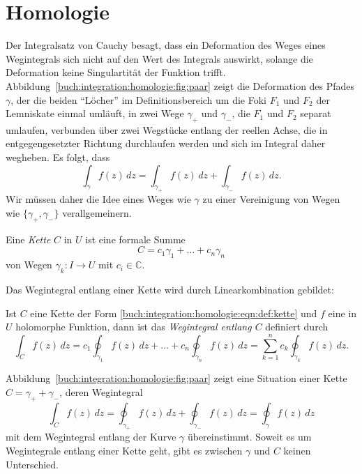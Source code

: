 %
%
%
\section{Homologie
\label{buch:integration:section:homologie}}
Der Integralsatz von Cauchy besagt, dass ein Deformation des Weges
eines Wegintegrals sich nicht auf den Wert des Integrals auswirkt,
solange die Deformation keine Singulartität der Funktion trifft.
%
Abbildung~\ref{buch:integration:homologie:fig:paar}
zeigt die Deformation des Pfades $\gamma$, der die beiden ``Löcher''
im Definitionsbereich um die Foki $F_1$ und $F_2$ der Lemniskate
einmal umläuft, in zwei Wege $\gamma_+$ und $\gamma_-$, die $F_1$
und $F_2$ separat umlaufen, verbunden über zwei Wegstücke entlang
der reellen Achse, die in entgegengesetzter Richtung durchlaufen
werden und sich im Integral daher wegheben.
Es folgt, dass
\[
\int_\gamma f(z)\,dz
=
\int_{\gamma_+} f(z)\,dz
+
\int_{\gamma_-} f(z)\,dz.
\]
Wir müssen daher die Idee eines Weges wie $\gamma$ zu einer 
Vereinigung von Wegen wie $\{\gamma_+,\gamma_-\}$ verallgemeinern.

\begin{definition}[Kette]
\label{buch:integration:homologie:def:kette}
Eine \emph{Kette} $C$ in $U$ ist eine formale Summe
%
\begin{equation}
C
=
c_1\gamma_1 + \dots + c_n\gamma_n
\label{buch:integration:homologie:eqn:def:kette}
\end{equation}
von Wegen $\gamma_k\colon I \to U$ mit $c_i\in\mathbb{C}$.
\end{definition}

Das Wegintegral entlang einer Kette wird durch Linearkombination
gebildet:

\begin{definition}
Ist $C$ eine Kette der Form
\eqref{buch:integration:homologie:eqn:def:kette}
und $f$ eine in $U$ holomorphe Funktion, dann ist das 
\emph{Wegintegral entlang $C$} definiert durch
%
\[
\int_C f(z)\,dz
=
c_1
\oint_{\gamma_1}f(z)\,dz
+
\ldots
+
c_n
\oint_{\gamma_n}f(z)\,dz
=
\sum_{k=1}^n
c_k \oint_{\gamma_k} f(z)\,dz.
\]
\end{definition}

Abbildung~\ref{buch:integration:homologie:fig:paar}
zeigt eine Situation einer Kette $C=\gamma_++\gamma_-$, deren
Wegintegral
\[
\int_C f(z)\,dz
=
\oint_{\gamma_+} f(z)\,dz
+
\oint_{\gamma_-} f(z)\,dz
=
\oint_{\gamma} f(z)\,dz
\]
mit dem Wegintegral entlang der Kurve $\gamma$ übereinstimmt.
Soweit es um Wegintegrale entlang einer Kette geht, gibt es 
zwischen $\gamma$ und $C$ keinen Unterschied.

